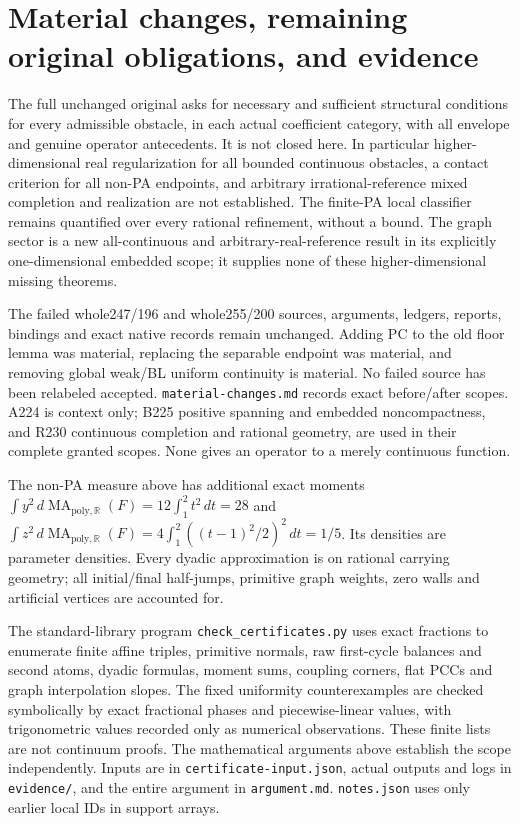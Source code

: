 \documentclass[11pt]{article}
\newcommand{\R}{\mathbb R}
\begin{document}
\section{Material changes, remaining original obligations, and evidence}
The full unchanged original asks for necessary and sufficient structural
conditions for every admissible obstacle, in each actual coefficient
category, with all envelope and genuine operator antecedents. It is not
closed here. In particular higher-dimensional real regularization for
all bounded continuous obstacles, a contact criterion for all non-PA
endpoints, and arbitrary irrational-reference mixed completion and
realization are not established. The finite-PA local classifier remains
quantified over every rational refinement, without a bound. The graph
sector is a new all-continuous and arbitrary-real-reference result in
its explicitly one-dimensional embedded scope; it supplies none of these
higher-dimensional missing theorems.

The failed whole247/196 and whole255/200 sources, arguments, ledgers,
reports, bindings and exact native records remain unchanged. Adding PC
to the old floor lemma was material, replacing the separable endpoint
was material, and removing global weak/BL uniform continuity is material.
No failed source has been relabeled accepted. \texttt{material-changes.md}
records exact before/after scopes. A224 is context only; B225 positive
spanning and embedded noncompactness, and R230 continuous completion and
rational geometry, are used in their complete granted scopes. None gives
an operator to a merely continuous function.

The non-PA measure above has additional exact moments
$\int y^2\,d\operatorname{MA}_{\mathrm{poly},\R}(F)=12\int_1^2t^2\,dt=28$ and
$\int z^2\,d\operatorname{MA}_{\mathrm{poly},\R}(F)=4\int_1^2((t-1)^2/2)^2\,dt=1/5$.
Its densities are parameter densities. Every dyadic approximation is
on rational carrying geometry; all initial/final half-jumps, primitive
graph weights, zero walls and artificial vertices are accounted for.

The standard-library program \texttt{check\_certificates.py} uses exact
fractions to enumerate finite affine triples, primitive normals, raw
first-cycle balances and second atoms, dyadic formulas, moment sums,
coupling corners, flat PCCs and graph interpolation slopes. The fixed
uniformity counterexamples are checked symbolically by exact fractional
phases and piecewise-linear values, with trigonometric values recorded
only as numerical observations. These finite lists are not continuum
proofs. The mathematical arguments above establish the scope independently.
Inputs are in \texttt{certificate-input.json}, actual outputs and logs
in \texttt{evidence/}, and the entire argument in \texttt{argument.md}.
\texttt{notes.json} uses only earlier local IDs in support arrays.
\end{document}
